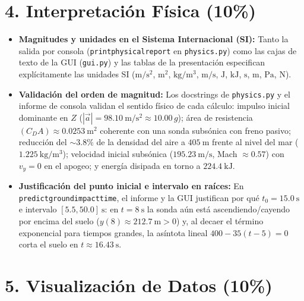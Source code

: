 \documentclass[10pt, a4paper]{article}
\renewcommand{\_}{\textunderscore\allowbreak}
\begin{document}
\section*{4. Interpretación Física (10\%)}

\begin{itemize}
    \item \textbf{Magnitudes y unidades en el Sistema Internacional (SI):} Tanto la salida por consola (\texttt{print\_physical\_report} en \texttt{physics.py}) como las cajas de texto de la GUI (\texttt{gui.py}) y las tablas de la presentación especifican explícitamente las unidades SI ($\mathrm{m/s^2}$, $\mathrm{m^2}$, $\mathrm{kg/m^3}$, $\mathrm{m/s}$, $\mathrm{J}$, $\mathrm{kJ}$, $\mathrm{s}$, $\mathrm{m}$, $\mathrm{Pa}$, $\mathrm{N}$).
    \item \textbf{Validación del orden de magnitud:} Los docstrings de \texttt{physics.py} y el informe de consola validan el sentido físico de cada cálculo: impulso inicial dominante en $Z$ ($|\vec{a}| = 98.10\ \mathrm{m/s^2} \approx 10.00\,g$); área de resistencia $(C_D A) \approx 0.0253\ \mathrm{m^2}$ coherente con una sonda subsónica con freno pasivo; reducción del $\sim 3.8\%$ de la densidad del aire a $405\ \mathrm{m}$ frente al nivel del mar ($1.225\ \mathrm{kg/m^3}$); velocidad inicial subsónica ($195.23\ \mathrm{m/s}$, Mach $\approx 0.57$) con $v_y = 0$ en el apogeo; y energía disipada en torno a $224.4\ \mathrm{kJ}$.
    \item \textbf{Justificación del punto inicial e intervalo en raíces:} En \texttt{predict\_ground\_impact\_time}, el informe y la GUI justifican por qué $t_0 = 15.0\ \mathrm{s}$ e intervalo $[5.5, 50.0]\ \mathrm{s}$: en $t = 8\ \mathrm{s}$ la sonda aún está ascendiendo/cayendo por encima del suelo ($y(8) \approx 212.7\ \mathrm{m} > 0$) y, al decaer el término exponencial para tiempos grandes, la asíntota lineal $400 - 35(t - 5) = 0$ corta el suelo en $t \approx 16.43\ \mathrm{s}$.
\end{itemize}

\section*{5. Visualización de Datos (10\%)}
\end{document}
